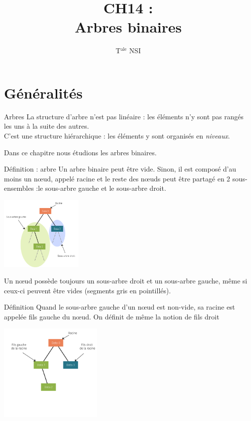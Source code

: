 \documentclass[10pt]{nsibeamer}
\title{CH14 : \\Arbres binaires}
\author{T$^{\text{ale}}$ NSI}
\begin{document}
\maketitle
\section{Généralités}
\begin{frame}{Arbres}
    La structure d'arbre n'est pas linéaire : les éléments n'y sont pas rangés les uns à la suite des autres.\\\pause
     C'est une structure \alert{hiérarchique} : les éléments y sont organisés en \textit{niveaux}.\\\pause
    
    Dans ce chapitre nous étudions les \alert{arbres binaires}.
\end{frame}

\begin{frame}{Définition : arbre}
    Un arbre binaire peut être vide.\pause
    Sinon, il est composé d'au moins un n\oe ud, appelé \alert{racine} et le reste des n\oe uds peut être partagé en 2 sous-ensembles :\pause le \alert{sous-arbre gauche} et le \alert{sous-arbre droit}.\pause
    \begin{center}
        \includegraphics[width=4cm]{img/arbre_bin_1}
    \end{center}\pause
Un n\oe ud possède toujours un sous-arbre droit et un sous-arbre gauche, même si ceux-ci peuvent être vides (segments gris en pointillés).
\end{frame}

\begin{frame}{Définition}
    Quand le sous-arbre gauche d'un n\oe ud est non-vide, sa racine est appelée \alert{fils gauche} du n\oe ud. On définit de même la notion de \alert{fils droit}
    \begin{center}
        \includegraphics[width=5cm]{img/arbre_bin_2}
    \end{center}
\end{frame}
\end{document}
